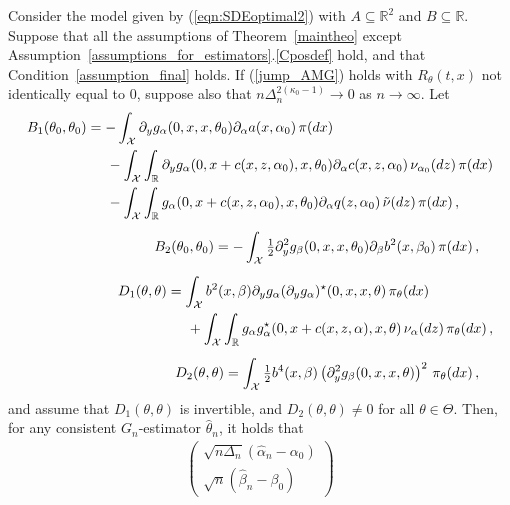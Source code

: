 \documentclass[11pt,a4paper]{article}
\newcommand{\thetan}{{\theta_0}}
\newcommand{\alphan}{{\alpha_0}}
\newcommand{\betan}{{\beta_0}}
\newcommand{\RR}{{\mathbb R}}
\newcommand{\xx}{{\mathcal{X}}}
\numberwithin{equation}{section}
\numberwithin{theorem}{section}
\begin{document}
%
\begin{theorem}
Consider the model given by (\ref{eqn:SDEoptimal2}) with $A \subseteq \RR^2$ and $B
\subseteq \RR$. Suppose that all the assumptions of Theorem~\ref{maintheo} except Assumption~\ref{assumptions_for_estimators}.\ref{Cposdef} hold, and that Condition~\ref{assumption_final} holds. If (\ref{jump_AMG}) holds with $R_\theta(t,x)$ not identically equal to $0$, suppose also that $n\Delta_n^{2({\kappa_0}-1)} \to 0$ as $n\to \infty$. Let 
\begin{align*}
\begin{split}
B_1(\thetan, \thetan) &= - \int_\xx \partial_y g_\alpha(0,x,x, \thetan)\partial_\alpha a(x,\alphan) \,\pi(dx)\\
&\hspace{5mm} - \int_\xx \int_\RR\partial_y g_\alpha(0,x+c(x,z,\alphan),x,\thetan)\partial_\alpha c(x,z, \alphan) \,\nu_\alphan(dz)\,\pi(dx)\\
&\hspace{5mm} - \int_\xx \int_\RR g_\alpha(0,x+c(x,z, \alphan),x, \thetan)\partial_\alpha   q(z,\alphan)\,\tilde{\nu}(dz)\,\pi(dx)\,,
\end{split}\\[0.5em]
\begin{split}
B_2(\thetan, \thetan) &= -\int_\xx \tfrac{1}{2}\partial^2_y g_\beta(0,x,x, \thetan) \partial_\beta b^2(x, \betan) \, \pi(dx)\,,
\end{split}\\[0.5em]
\begin{split}
D_1(\theta, \theta)
&= \int_\xx b^2(x, \beta)\partial_y g_\alpha (\partial_y g_\alpha)^\star (0,x,x,\theta) \,\pi_\theta(dx)\\
&\hspace{5mm} + \int_\xx \int_\RR g_\alpha g_\alpha^\star (0,x+c(x,z, \alpha),x,\theta)\,\nu_\alpha(dz)\, \pi_\theta(dx)\,,
\end{split}\\[0.5em]
\begin{split}
D_2(\theta, \theta) 
&= \int_\xx \tfrac{1}{2}  b^4(x, \beta)  \left(\partial^2_y g_\beta(0,x,x, \theta)\right)^2 \,\pi_\theta(dx)\,,
\end{split}
\end{align*}
and assume that $D_1(\theta, \theta)$ is invertible, and $D_2(\theta, \theta)\neq 0$ for all $\theta \in \Theta$. Then, for any consistent $G_n$-estimator $\hat{\theta}_n$, it holds that
\begin{align}
\begin{pmatrix} \sqrt{n\Delta_n} (\hat{\alpha}_n - \alphan) \\  \sqrt{n}(\hat{\beta}_n-\betan) \end{pmatrix}

\end{align}
\end{theorem}
\end{document}
